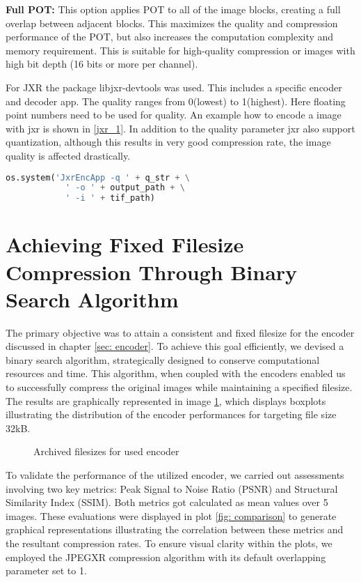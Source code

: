 \textbf{Full POT:} This option applies POT to all of the image blocks, creating a full overlap between adjacent blocks. This maximizes the quality and compression performance of the POT, but also increases the computation complexity and memory requirement. This is suitable for high-quality compression or images with high bit depth (16 bits or more per channel).

For JXR the package libjxr-devtools was used. This includes a specific encoder and decoder app. The quality ranges from 0(lowest) to 1(highest). Here floating point numbers need to be used for quality.
An example how to encode a image with jxr is shown in \ref{jxr_1}. In addition to the quality parameter jxr also support quantization, although this results in very good compression rate, the image quality is affected drastically.
\begin{lstlisting}[label={jxr_1}, language=Python, caption=Encode BPG]
os.system('JxrEncApp -q ' + q_str + \
            ' -o ' + output_path + \
            ' -i ' + tif_path)
\end{lstlisting}

\newpage
\section{Achieving Fixed Filesize Compression Through Binary Search Algorithm}
\label{sec: filesize}

The primary objective was to attain a consistent and fixed filesize for the encoder discussed in chapter \ref{sec: encoder}. To achieve this goal efficiently, we devised a binary search algorithm, strategically designed to conserve computational resources and time. This algorithm, when coupled with the encoders enabled us to successfully compress the original images while maintaining a specified filesize. The results are graphically represented in image \ref{fig: fsize_comparison}, which displays boxplots illustrating the distribution of the encoder performances for targeting file size 32kB.

\begin{figure}[h!]
	\centering
	\resizebox{\textwidth}{!}{}
	\caption{Archived filesizes for used encoder}
	\label{fig: fsize_comparison}
\end{figure}

\noindent
To validate the performance of the utilized encoder, we carried out assessments involving two key metrics: Peak Signal to Noise Ratio (PSNR) and Structural Similarity Index (SSIM). Both metrics got calculated as mean values over 5 images. These evaluations were displayed in plot \ref{fig: comparison} to generate graphical representations illustrating the correlation between these metrics and the resultant compression rates. To ensure visual clarity within the plots, we employed the JPEGXR compression algorithm with its default overlapping parameter set to 1.

